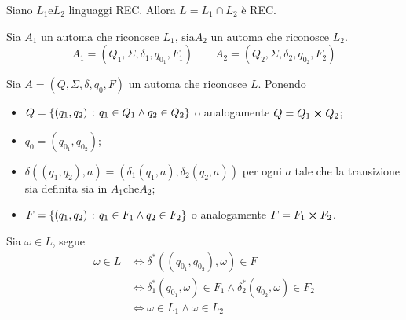 \documentclass{subfiles}
\begin{document}
\begin{Theorem}
    Siano \(L_{1} \text{e} L_{2}\) linguaggi REC. Allora \(L = L_{1} \cap L_{2}\) è REC.

    \begin{Proof*}
        Sia \(A_{1}\) un automa che riconosce \(L_{1} \text{, sia} A_{2}\) un automa che riconosce \(L_{2}\).
        \[
            A_{1} = (Q_{1}, \Sigma, \delta_{1}, q_{0_{1}}, F_{1}) \qquad A_{2} = (Q_{2}, \Sigma, \delta_{2}, q_{0_{2}}, F_{2})
        \]

        \noindent Sia \(A = (Q, \Sigma, \delta, q_{0}, F)\) un automa che riconosce \(L\). Ponendo
        \begin{itemize}
            \item \(Q = \left\{(q_{1}, q_{2}) \operatorname{\: {:} \:} q_{1} \in Q_{1} \land q_{2} \in Q_{2}\right\}\) o analogamente \(Q = Q_{1} \cp Q_{2}\);
            \item \(q_{0} = (q_{0_{1}}, q_{0_{2}})\);
            \item \(\delta((q_{1}, q_{2}), a) = (\delta_{1}(q_{1}, a), \delta_{2}(q_{2}, a))\) per ogni \(a\) tale che la transizione sia definita sia in \(A_{1} \text{che} A_{2}\);
            \item \(F = \left\{(q_{1}, q_{2}) \operatorname{\: {:} \:} q_{1} \in F_{1} \land q_{2} \in F_{2}\right\}\) o analogamente \(F = F_{1} \cp F_{2}\).
        \end{itemize}

        \noindent Sia \(\omega \in L\), segue
        \[\begin{aligned}
                \omega \in L & \iff \delta^{*}((q_{0_{1}}, q_{0_{2}}), \omega) \in F                                              \\
                             & \iff \delta_{1}^{*}(q_{0_{1}}, \omega) \in F_{1} \land \delta_{2}^{*}(q_{0_{2}}, \omega) \in F_{2} \\
                             & \iff \omega \in L_{1} \land \omega \in L_{2}                                                       \\
            \end{aligned}\]
    \end{Proof*}
\end{Theorem}
\clearpage
\end{document}

